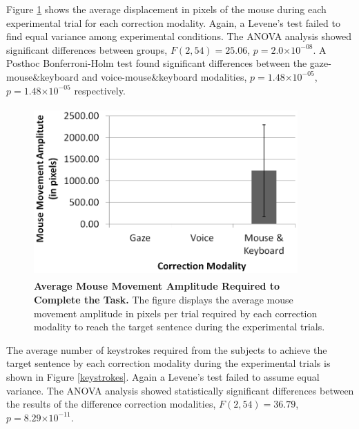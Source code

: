 \documentclass[]{article}
\providecommand{\e}[1]{\ensuremath{\times 10^{#1}}}
\begin{document}
Figure \ref{mouseDisplacement} shows the average displacement in pixels of the mouse during each experimental trial for
each correction modality. Again, a Levene's test failed to find equal variance among experimental conditions. The ANOVA
analysis showed significant differences between groups,  $F(2,54)=25.06$, $p=2.0\e{-08}$. A Posthoc Bonferroni-Holm test
found significant differences between the gaze-mouse\&keyboard and voice-mouse\&keyboard modalities,  $p=1.48\e{-05}$,
$p=1.48\e{-05}$ respectively.


\begin{figure}[!ht]
\begin{center}
\vspace{-3mm}
\includegraphics[width=0.9\textwidth,height=65mm]{figures/mouseDisplacement.png}
\end{center}
\caption{\textbf{Average Mouse Movement Amplitude Required to Complete the Task.} The figure displays the average mouse
movement amplitude in pixels per trial required by each correction modality to reach the target sentence during the
experimental trials.}
\label{mouseDisplacement}
\end{figure}


The average number of keystrokes required from the subjects to achieve the target sentence by each correction modality
during the experimental trials is shown in Figure \ref{keystrokes}. Again a Levene's test failed to assume equal
variance. The ANOVA analysis showed statistically significant differences between the results of the
difference correction modalities, $F(2,54)=36.79$, $p=8.29\e{-11}$. 
\end{document}

